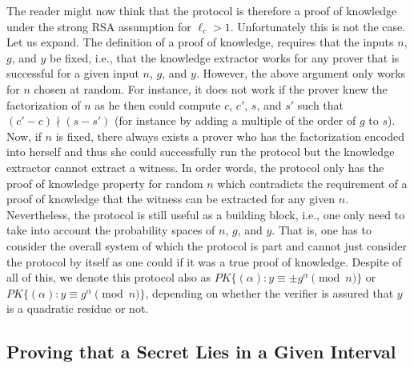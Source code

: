 The reader might now think that the protocol is therefore a proof of knowledge under
the strong RSA assumption for $\ell_c > 1$.
Unfortunately this is not the case.
Let us expand.
The definition of a proof of knowledge, 
requires that the inputs $n$, $g$, and $y$ be fixed, i.e., that
the knowledge extractor works for any prover that is successful for a 
given input $n$, $g$, and $y$.
However, the above argument only works for $n$ chosen at random.
For instance, it does not work if the prover knew the factorization of 
$n$ as he then could compute $c$, $c'$, $s$, and $s'$ such that
$(c'-c) \nmid (s-s')$ (for instance by adding a multiple of the order of 
$g$ to $s$).
Now, if $n$ is fixed, there always exists a prover who has the factorization 
encoded into herself and thus she could successfully run the protocol but the
knowledge extractor cannot extract a witness.
In order words, the protocol only has the proof of knowledge property 
for random $n$ which contradicts the requirement of a proof of knowledge that 
the witness can be extracted for any given $n$.
Nevertheless, the protocol is still useful as a building block, i.e., 
one only need to take into account the probability spaces of $n$, $g$, and $y$.
That is, one has to consider the overall system of which the protocol is part and cannot just
consider the protocol by itself as one could if it was a true proof of knowledge.
Despite of all of this, we denote this protocol also as 
$\textit{PK}\{(\alpha): y \equiv \pm g^\alpha \pmod{n}\}$ or
$\textit{PK}\{(\alpha): y \equiv g^\alpha \pmod{n}\}$, depending on whether the verifier
is assured that $y$ is a quadratic residue or not.

\subsection{Proving that a Secret Lies in a Given Interval}
\label{Proving that a Secret Lies in a Given Interval}

